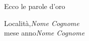 %
%
%

\preface

Ecco le parole d'oro


\vspace{1cm}
\begin{flushright}\noindent
Localit\`{a},\hfill {\it Nome Cognome}\\
mese anno\hfill {\it Nome Cognome}\\
\end{flushright}


